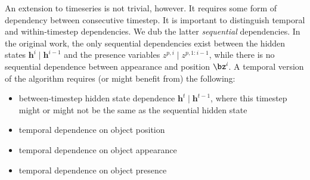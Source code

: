 \documentclass[]{article}
\begin{document}
    An extension to timeseries is not trivial, however. It requires some form of dependency between consecutive timestep. It is important to distinguish temporal and within-timestep dependencies. We dub the latter \emph{sequential} dependencies. In the original work, the only sequential dependencies exist between the hidden states $\bm{h}^i \mid \bm{h}^{i-1}$ and the presence variables $z^{p, i} \mid z^{p, 1:i-1}$, while there is no sequential dependence between appearance and position $\bz^i$. A temporal version of the algorithm requires (or might benefit from) the following:
    \begin{itemize}
        \item between-timestep hidden state dependence \eg $\bm{h}^t \mid \bm{h}^{t-1}$, where this timestep might or might not be the same as the sequential hidden state
        \item temporal dependence on object position
        \item temporal dependence on object appearance
        \item temporal dependence on object presence
        
    \end{itemize}
    
    
	\printbibliography
\end{document}
